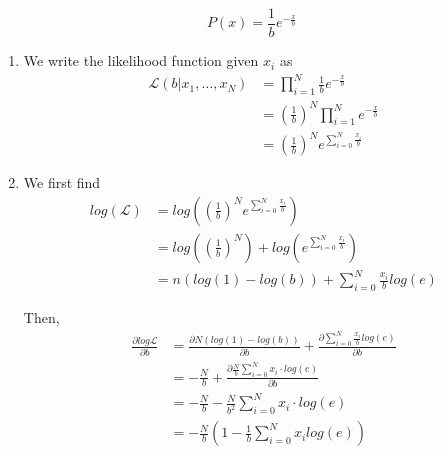 \documentclass{article}
\begin{document}
\begin{enumerate}
\begin{equation*}
            P(x) = \frac{1}{b}e^{-\frac{x}{b}}
        \end{equation*}
        \begin{enumerate}
            \item %
                We write the likelihood function given \(x_i\) as
                \begin{align*}
                \mathcal{L}(b|x_1,\hdots,x_N) 
                &= \prod_{i = 1}^N \frac{1}{b}e^{-\frac{x}{b}}\\
                &= \left(\frac{1}{b}\right)^N \prod_{i = 1}^N e^{-\frac{x}{b}}\\
                &= \left(\frac{1}{b}\right)^N e^{\sum_{i=0}^N \frac{x_i}{b}}
                \end{align*}

            \item %
                We first find
                \begin{align*}
                log(\mathcal{L}) 
                    &= log\left(\left(\frac{1}{b}\right)^N e^{\sum_{i=0}^N 
                        \frac{x_i}{b}}\right)\\
                    &= log\left(\left(\frac{1}{b}\right)^N\right) + 
                        log\left(e^{\sum_{i=0}^N \frac{x_i}{b}}\right)\\
                    &= n(log(1) - log(b)) + \sum_{i=0}^N \frac{x_i}{b}log(e)
                \end{align*}

                Then,
                \begin{align*}
                    \frac{\partial log \mathcal{L}}{\partial b}
                    &= \frac{\partial N(log(1) - log(b))}{\partial b} + 
                        \frac{\partial \sum_{i=0}^N 
                        \frac{x_i}{b}log(e)}{\partial b}\\
                    &= -\frac{N}{b} + \frac{\partial \frac{N}{b}
                        \sum_{i=0}^N x_i\cdot log(e)}{\partial b}\\
                    &= -\frac{N}{b} - \frac{N}{b^2}\sum_{i=0}^N x_i\cdot 
                        log(e)\\
                    &= -\frac{N}{b}\left(1-\frac{1}{b}\sum_{i=0}^N x_i 
                        log(e)\right)
                \end{align*}


\end{enumerate}
\end{enumerate}
\end{document}
